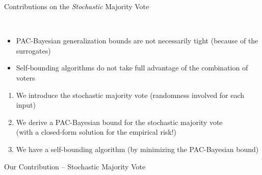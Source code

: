 \documentclass{slides}
\begin{document}
\begin{xframe}{Contributions on the {\it Stochastic} Majority Vote}

\vfill

\\[0.5cm]
\begin{itemize}

    \item[\red{\bf --} ] PAC-Bayesian generalization bounds are not necessarily tight (because of the surrogates)\\[0.3cm]
    
    \item[\red{\bf --} ] Self-bounding algorithms do not take full advantage of the combination of voters
\end{itemize}

\vfill

\begin{redbox}{}
\begin{enumerate}
    \item We introduce the stochastic majority vote {\scriptsize (randomness involved for each input)}\\[-0.3cm]
    \item We derive a PAC-Bayesian bound for the stochastic majority vote\\ {\scriptsize (with a closed-form solution for the empirical risk!)}\\[-0.3cm]
    \item We have a self-bounding algorithm (by minimizing the PAC-Bayesian bound)
\end{enumerate}    
\end{redbox}

\vfill

\end{xframe}


\begin{xframe}{Our Contribution -- {\small Stochastic Majority Vote}}

\vfill
\begin{figure}
    \centering
    
\end{figure}
\vfill

\end{xframe}

\end{document}
